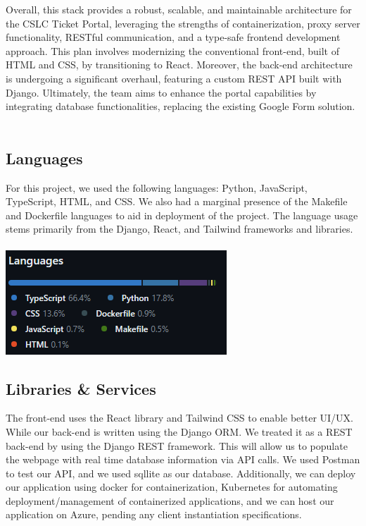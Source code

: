 \documentclass[oneside,openany,obeyspaces]{book}
\newcommand\tab[1][1cm]{\hspace*{#1}}
\begin{document}
\begin{flushleft}
    Overall, this stack provides a robust, scalable, and maintainable architecture for the CSLC Ticket Portal, leveraging the strengths of containerization, proxy server functionality, RESTful communication, and a type-safe frontend development approach.
    This plan involves modernizing the conventional front-end, built of HTML and CSS, by transitioning to React. Moreover, the back-end architecture is undergoing a significant overhaul, featuring a custom REST API built with Django. Ultimately, the team aims to enhance the portal capabilities by integrating database functionalities, replacing the existing Google Form solution.\\~\\

    \subsection{Languages}

    \tab For this project, we used the following languages: Python, JavaScript, TypeScript, HTML, and CSS. We also had a marginal presence of the Makefile and Dockerfile languages to aid in deployment of the project. The language usage stems primarily from the  Django, React, and Tailwind frameworks and libraries.\\~\\
    \includegraphics[width=.25\linewidth]{img/Languages.png}

    \subsection{Libraries \& Services}

    \tab The front-end uses the React library and Tailwind CSS to enable better UI/UX. While our back-end is written using the Django ORM. We treated it as a REST back-end by using the Django REST framework. This will allow us to populate the webpage with real time database information via API calls. We used Postman to test our API, and we used sqllite as our database. Additionally, we can deploy our application using docker for containerization, Kubernetes for automating deployment/management of containerized applications, and we can host our application on Azure, pending any client instantiation specifications.\\~\\



\end{flushleft}
\end{document}
